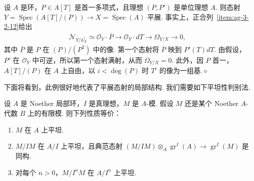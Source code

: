 \begin{example}\label{item:ag-3-3-9}
设 $A$ 是环，$P\in A[T]$ 是首一多项式，且理想 $(P,P')$ 是单位理想 $A$. 则态射 $Y=\operatorname{Spec}(A[T]/(P))\longrightarrow X=\operatorname{Spec}(A)$ 平展. 事实上，正合列~\ref{item:ag-3-2-12}给出
\begin{align*}
\mathcal N_{Y/\mathbb A_X^1}\simeq\mathcal O_Y\cdot\overline P\longrightarrow\mathcal O_Y\cdot dT\longrightarrow\Omega_{Y/X}\longrightarrow0,
\end{align*}
其中 $\overline P$ 是 $P$ 在 $(P)/(P^2)$ 中的像. 第一个态射将 $\overline P$ 映到 $P'(T)dT$. 由假设，$P'$ 在 $\mathcal O_Y$ 中可逆，所以第一个态射满射，从而 $\Omega_{Y/X}=0$. 此外，因 $P$ 首一，$A[T]/(P)$ 在 $A$ 上自由，以 $i<\deg(P)$ 时 $T^i$ 的像为一组基.\unskip\nobreak\hfill\ensuremath{\diamond}
\renewcommand{\envenddiamond}{}
\end{example}
下面将看到，此例很好地代表了平展态射的局部结构. 我们需要如下平坦性判别法.
\begin{proposition}\label{item:ag-3-3-10}
设 $A$ 是 Noether 局部环，$I$ 是真理想，$M$ 是 $A$-模. 假设 $M$ 还是某个 Noether $A$-代数 $B$ 上的有限模. 则下列性质等价：
\begin{enumerate}[label=\roman*)]
\item $M$ 在 $A$ 上平坦.
\item $M/IM$ 在 $A/I$ 上平坦，且典范态射 $(M/IM)\otimes_A\operatorname{gr}^{I}(A)\longrightarrow\operatorname{gr}^{I}(M)$ 是同构.
\item 对每个 $n>0$，$M/I^nM$ 在 $A/I^n$ 上平坦.
\end{enumerate}
\end{proposition}
